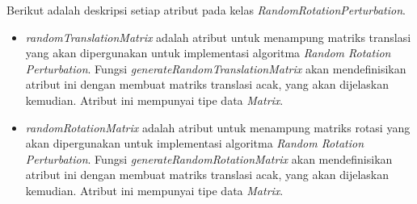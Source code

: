 Berikut adalah deskripsi setiap atribut pada kelas \textit{RandomRotationPerturbation}.
\begin{itemize}
	\item \textit{randomTranslationMatrix} adalah atribut untuk menampung matriks translasi yang akan dipergunakan untuk implementasi algoritma \textit{Random Rotation Perturbation}. Fungsi \textit{generateRandomTranslationMatrix} akan mendefinisikan atribut ini dengan membuat matriks translasi acak, yang akan dijelaskan kemudian. Atribut ini mempunyai tipe data \textit{Matrix}.
	\item \textit{randomRotationMatrix} adalah atribut untuk menampung matriks rotasi yang akan dipergunakan untuk implementasi algoritma \textit{Random Rotation Perturbation}. Fungsi \textit{generateRandomRotationMatrix} akan mendefinisikan atribut ini dengan membuat matriks translasi acak, yang akan dijelaskan kemudian. Atribut ini mempunyai tipe data \textit{Matrix}.
\end{itemize}

